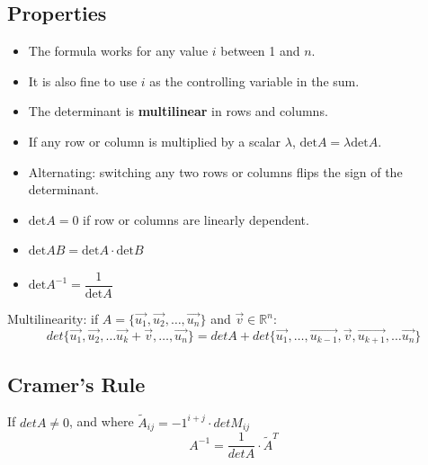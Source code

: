 \documentclass[11pt]{article}
\begin{document}
	\subsection{Properties}
		\begin{itemize}
			\item The formula works for any value $i$ between 1 and $n$.
			\item It is also fine to use $i$ as the controlling variable in the sum.
			\item The determinant is \textbf{multilinear} in rows and columns.
			\item If any row or column is multiplied by a scalar $\lambda$, $\text{det} A = \lambda\text{det} A$.
			\item Alternating: switching any two rows or columns flips the sign of the determinant.
			\item $\text{det} A = 0$ if row or columns are linearly dependent.
			\item $\text{det} AB = \text{det} A\cdot\text{det} B$
			\item $\text{det} A^{-1} = \dfrac{1}{\text{det} A}$
		\end{itemize}
		Multilinearity: if $A=\{\vec{u_1}, \vec{u_2},\ldots,\vec{u_n}\}$ and $\vec{v}\in\mathbb{R}^n$:
		\begin{equation}
			det\{\vec{u_1}, \vec{u_2},\ldots\vec{u_k}+\vec{v},\ldots,\vec{u_n}\} = det A + det\{\vec{u_1},\ldots,\vec{u_{k-1}},\vec{v},\vec{u_{k+1}},\ldots\vec{u_n}\}
		\end{equation}
		
	\subsection{Cramer's Rule}
		If $det A\neq 0$, and where $\tilde{A}_{ij} = -1^{i+j}\cdot detM_{ij}$
		\begin{equation}
			A^{-1} = \frac{1}{det A}\cdot \tilde{A}^T
		\end{equation}
%		
%		


\end{document}

